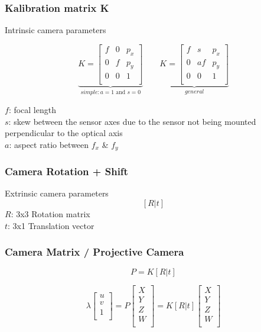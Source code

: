 \subsubsection{Kalibration matrix K}
Intrinsic camera parameters

$$ \underbrace{K = \begin{bmatrix}
f&0&p_x\\
0&f&p_y\\
0&0&1\\
\end{bmatrix}}_{simple: a=1 \text{ and } s=0}  \qquad \underbrace{K = \begin{bmatrix}
f&s&p_x\\
0&af&p_y\\
0&0&1\\
\end{bmatrix}}_{general}$$

$f$: focal length\\
$s$: skew between the sensor axes due to the sensor not being mounted perpendicular to the optical axis\\
$a$: aspect ratio between $f_x$ \& $f_y$

\subsubsection{Camera Rotation + Shift}
Extrinsic camera parameters
$$ [R|t] $$
$R$: 3x3 Rotation matrix\\
$t$: 3x1 Translation vector

\subsubsection{Camera Matrix / Projective Camera}
$$ P = K[R|t] $$

$$ \lambda \begin{bmatrix}
u\\
v\\
1\\
\end{bmatrix} = P \begin{bmatrix}
X\\
Y\\
Z\\
W\\
\end{bmatrix} = K[R|t] \begin{bmatrix}
X\\
Y\\
Z\\
W\\
\end{bmatrix} $$

